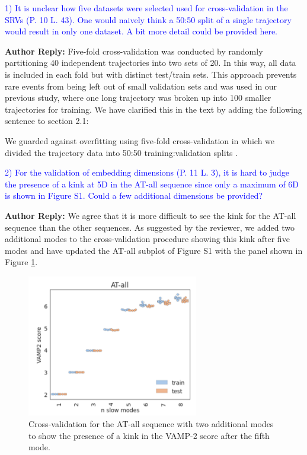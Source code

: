 \documentclass[11pt,a4paper]{letter} %
\newcommand*{\rood}[1]{{\color{red}{#1}}}
\begin{document}
\textcolor{blue}{1)      It is unclear how five datasets were selected used for cross-validation in the SRVs (P. 10 L. 43). One would naively think a 50:50 split of a single trajectory would result in only one dataset. A bit more detail could be provided here.}

\textbf{Author Reply:}   Five-fold cross-validation was conducted by randomly partitioning 40 independent trajectories into two sets of 20. In this way, all data is included in each fold but with distinct test/train sets. This approach prevents rare events from being left out of small validation sets and was used in our previous study, where one long trajectory was broken up into 100 \citep{Sidky2019High-ResolutionVAMPnets} smaller trajectories for training. We have  clarified this in the text by adding the following sentence to section 2.1: 

We guarded against overfitting using five-fold cross-validation in which we divided the trajectory data into 50:50 training:validation splits \rood{such that random combinations of 20 trajectories were partitioned into each set}.\citep{Sidky2019High-ResolutionVAMPnets}

\textcolor{blue}{2)      For the validation of embedding dimensions (P. 11 L. 3), it is hard to judge the presence of a kink at 5D in the AT-all sequence since only a maximum of 6D is shown in Figure S1. Could a few additional dimensions be provided?}

\textbf{Author Reply:}   We agree that it is more difficult to see the kink for the AT-all sequence than the other sequences. As suggested by the reviewer, we added two additional modes to the cross-validation procedure showing this kink after five modes and have updated the AT-all subplot of Figure S1 with the panel shown in Figure \ref{fig:AT-all_crossval}.

\begin{figure}[ht!]
	\begin{center}
        \includegraphics[width=75mm]{cover_letter/revision_figures/AT-all_added_modes.png}
        \caption{Cross-validation for the AT-all sequence with two additional modes to show the presence of a kink in the VAMP-2 score after the fifth mode.}
        \label{fig:AT-all_crossval}
	\end{center}
\end{figure}
\end{document}

